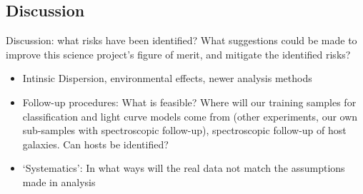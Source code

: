 
\subsection{Discussion}
\label{sec:keyword:discussion}

Discussion: what risks have been identified? What suggestions could be
made to improve this science project's figure of merit, and mitigate
the identified risks?


\begin{itemize}
\item Intinsic Dispersion, environmental effects, newer analysis methods
\item Follow-up procedures: What is feasible? Where will our training samples for classification and light curve models come from (other experiments, our own 
sub-samples with spectroscopic follow-up), spectroscopic follow-up of host galaxies. Can hosts be identified?
\item `Systematics': In what ways will the real data not match the assumptions made in analysis
\end{itemize}



\navigationbar
